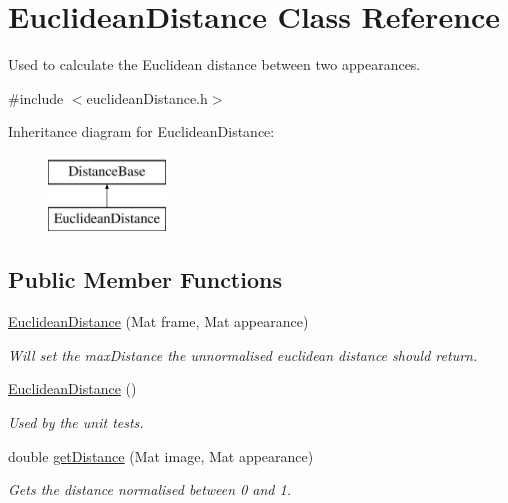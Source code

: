 \hypertarget{class_euclidean_distance}{}\section{Euclidean\+Distance Class Reference}
\label{class_euclidean_distance}


Used to calculate the Euclidean distance between two appearances.  




{\ttfamily \#include $<$euclidean\+Distance.\+h$>$}

Inheritance diagram for Euclidean\+Distance\+:\begin{figure}[H]
\begin{center}
\leavevmode
\includegraphics[height=2.000000cm]{class_euclidean_distance}
\end{center}
\end{figure}
\subsection*{Public Member Functions}
\begin{DoxyCompactItemize}
\item 
\hyperlink{class_euclidean_distance_a5e83b718959ef7c4b41d88b6b2f1cc97}{Euclidean\+Distance} (Mat frame, Mat appearance)
\begin{DoxyCompactList}\small\item\em Will set the max\+Distance the unnormalised euclidean distance should return. \end{DoxyCompactList}\item 
\hypertarget{class_euclidean_distance_a345c01bfb2649bb9c7f93eb04edf3c03}{}\hyperlink{class_euclidean_distance_a345c01bfb2649bb9c7f93eb04edf3c03}{Euclidean\+Distance} ()\label{class_euclidean_distance_a345c01bfb2649bb9c7f93eb04edf3c03}

\begin{DoxyCompactList}\small\item\em Used by the unit tests. \end{DoxyCompactList}\item 
double \hyperlink{class_euclidean_distance_a1b3123ed61577c68d3c5fa1767950314}{get\+Distance} (Mat image, Mat appearance)
\begin{DoxyCompactList}\small\item\em Gets the distance normalised between 0 and 1. \end{DoxyCompactList}\end{DoxyCompactItemize}
